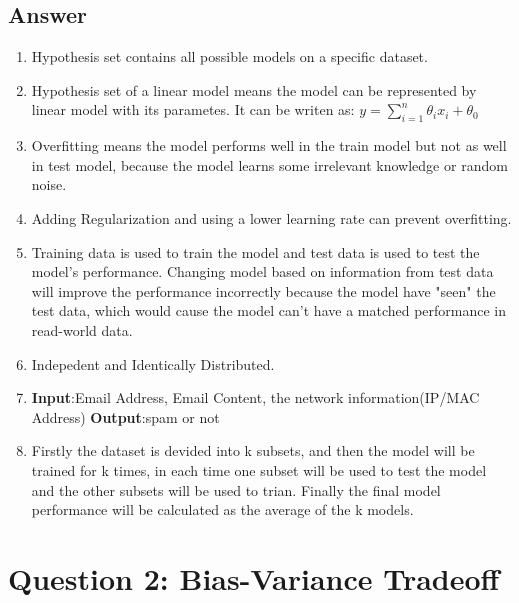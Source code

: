 \documentclass[
	12pt, %
]{fphw}
\begin{document}
\subsection*{Answer}
\begin{enumerate}
	\itemsep0.3em
	\parskip0.3em
	\item Hypothesis set contains all possible models on a specific dataset.
	\item Hypothesis set of a linear model means the model can be represented by linear model with its parametes. It can be writen as: $y = \sum_{i = 1}^{n}\theta_i x_i+\theta_0  $
	\item Overfitting means the model performs well in the train model but not as well in test model, because the model learns some irrelevant knowledge or random noise. 
	\item Adding Regularization and using a lower learning rate can prevent overfitting.
	\item Training data is used to train the model and test data is used to test the model's performance. Changing model based on information from test data will improve the performance incorrectly 
	because the model have "seen" the test data, which would cause the model can't have a matched performance in read-world data.
	\item Indepedent and Identically Distributed.
	\item \textbf{Input}:Email Address, Email Content, the network information(IP/MAC Address) \textbf{Output}:spam or not
	\item Firstly the dataset is devided into k subsets, and then the model will be trained for k times, in each time one subset will be used to test the model and the other subsets will be used to trian. Finally the final model performance will be calculated as the average of the k models.
\end{enumerate}


\section*{Question 2: Bias-Variance Tradeoff}
\end{document}
